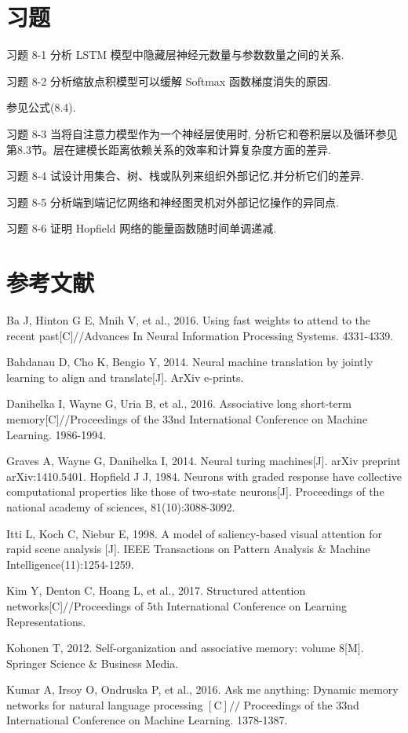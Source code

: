 \documentclass[10pt]{article}
\begin{document}
\section*{习题}
习题 8-1 分析 LSTM 模型中隐藏层神经元数量与参数数量之间的关系.

习题 8-2 分析缩放点积模型可以缓解 Softmax 函数梯度消失的原因.

参见公式(8.4).

习题 8-3 当将自注意力模型作为一个神经层使用时, 分析它和卷积层以及循环参见第8.3节。层在建模长距离依赖关系的效率和计算复杂度方面的差异.

习题 8-4 试设计用集合、树、栈或队列来组织外部记忆,并分析它们的差异.

习题 8-5 分析端到端记忆网络和神经图灵机对外部记忆操作的异同点.

习题 8-6 证明 Hopfield 网络的能量函数随时间单调递减.

\section*{参考文献}
Ba J, Hinton G E, Mnih V, et al., 2016. Using fast weights to attend to the recent past[C]//Advances In Neural Information Processing Systems. 4331-4339.

Bahdanau D, Cho K, Bengio Y, 2014. Neural machine translation by jointly learning to align and translate[J]. ArXiv e-prints.

Danihelka I, Wayne G, Uria B, et al., 2016. Associative long short-term memory[C]//Proceedings of the 33nd International Conference on Machine Learning. 1986-1994.

Graves A, Wayne G, Danihelka I, 2014. Neural turing machines[J]. arXiv preprint arXiv:1410.5401. Hopfield J J, 1984. Neurons with graded response have collective computational properties like those of two-state neurons[J]. Proceedings of the national academy of sciences, 81(10):3088-3092.

Itti L, Koch C, Niebur E, 1998. A model of saliency-based visual attention for rapid scene analysis [J]. IEEE Transactions on Pattern Analysis \& Machine Intelligence(11):1254-1259.

Kim Y, Denton C, Hoang L, et al., 2017. Structured attention networks[C]//Proceedings of 5th International Conference on Learning Representations.

Kohonen T, 2012. Self-organization and associative memory: volume 8[M]. Springer Science \& Business Media.

Kumar A, Irsoy O, Ondruska P, et al., 2016. Ask me anything: Dynamic memory networks for natural language processing $[\mathrm{C}] / /$ Proceedings of the 33nd International Conference on Machine Learning. 1378-1387.
\end{document}
